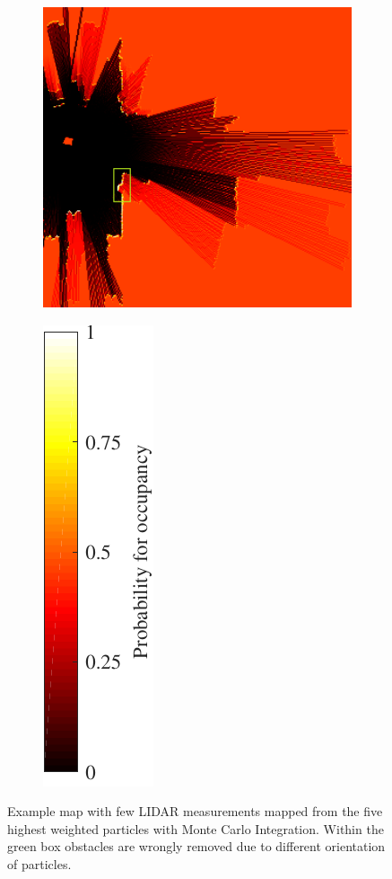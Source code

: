 \begin{figure}[htbp]
    \centering
    \begin{subfigure}[t]{0.65\textwidth}
    \includegraphics[height=3.5in]{figures/static_mapping/montecarlo_removing_obstacles}	
    \end{subfigure}
    \begin{subfigure}[t]{0.2\textwidth}
        \includegraphics[scale=1.0]{figures/static_mapping/montecarlo_removing_obstacles_bar-crop}
    \end{subfigure}
    \caption{Example map with few LIDAR measurements mapped from the five highest weighted particles with Monte Carlo Integration. Within the green box obstacles are wrongly removed due to different orientation of particles.}
\end{figure}

